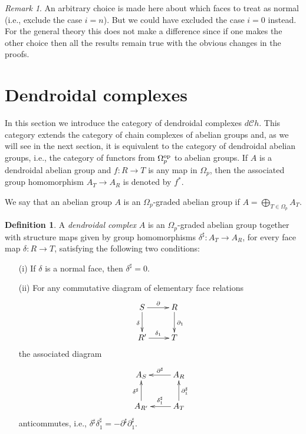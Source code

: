 \documentclass[a4paper]{amsart}
\theoremstyle{plain}
\theoremstyle{definition}
\newtheorem{dfn}[thm]{Definition}
\theoremstyle{remark}
\newtheorem{rem}[thm]{Remark}
\newcommand{\rpd}{\Omega_p}
\newcommand{\To}{\longrightarrow}
\newcommand{\dCh}{d\mathcal{C}h}
\numberwithin{equation}{section}
\numberwithin{figure}{section}
\begin{document}
\begin{rem}
An arbitrary choice is made here about which faces to treat as
normal (i.e., exclude the case $i=n$). But we could have excluded
the case $i=0$ instead. For the general theory this does not make a
difference since if one makes the other choice then all the results
remain true with the obvious changes in the proofs.
\end{rem}


\section{Dendroidal complexes}
In this section we introduce the category of dendroidal complexes $\dCh$. This category extends the category of chain complexes of abelian groups and, as we will see in the next section, it is equivalent to the category of dendroidal abelian groups, i.e., the category of functors from $\rpd^{{\rm op}}$ to abelian
groups. If $A$ is a dendroidal abelian group and $f\colon R\longrightarrow T$ is any map in $\rpd$, then the associated group homomorphism
$A_T\longrightarrow A_R$ is denoted by $f^*$.

We say that an abelian group $A$ is an $\rpd$-graded abelian group if $A=\bigoplus_{T\in \rpd} A_T$.
\begin{dfn}
A \emph{dendroidal complex} $A$ is an $\rpd$-graded abelian group together with structure maps given by group
homomorphisms $\delta^\sharp\colon A_T\To A_R$, for every face map $\delta\colon R\To T$, satisfying the
following two conditions:
\begin{itemize}
\item[{\rm (i)}] If $\delta$ is a normal face, then $\delta^\sharp=0$.
\item[{\rm (ii)}] For any commutative diagram of elementary face relations
$$
\xymatrix{
S\ar[r]^\partial\ar[d]_\delta & R \ar[d]^{\partial_1} \\
R'\ar[r]^{\delta_1} & T }
$$
the associated diagram
\[
\xymatrix{
A_S & A_{R} \ar[l]_{\partial^\sharp} \\
A_{R'}\ar[u]^{\delta^\sharp} & A_T\ar[l]_{\delta_1^\sharp}\ar[u]_{\partial_1^\sharp} }
\]
anticommutes, i.e., $\delta^{\sharp}\delta_1^{\sharp}=-\partial^{\sharp}\partial_1^{\sharp}$.
\end{itemize}
\end{dfn}
\end{document}
